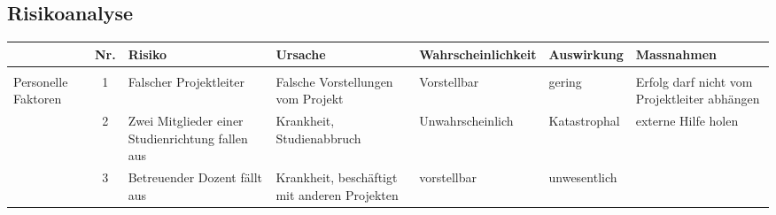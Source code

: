 \begin{landscape}
\section{Risikoanalyse}
\begin{table}[h!]
    \centering
    \begin{tabular}{p{} c p{} p{} p{} p{} p{}}
		& Nr. & Risiko & Ursache & Wahrscheinlichkeit & Auswirkung & Massnahmen \\
        \hline \hline
        & & & & & & \\
        \rowcolor{yellow} 
        Personelle Faktoren & 1 & Falscher Projektleiter & Falsche Vorstellungen vom Projekt & Vorstellbar & gering & Erfolg darf nicht vom Projektleiter abhängen \\ 
        \rowcolor{yellow}
	    & 2 & Zwei Mitglieder einer Studienrichtung fallen aus & Krankheit, Studienabbruch & Unwahrscheinlich & Katastrophal & externe Hilfe holen \\
        \rowcolor{green}
        & 3 & Betreuender Dozent fällt aus & Krankheit, beschäftigt mit anderen Projekten & vorstellbar & unwesentlich &
	\end{tabular}
\end{table}
\end{landscape}
